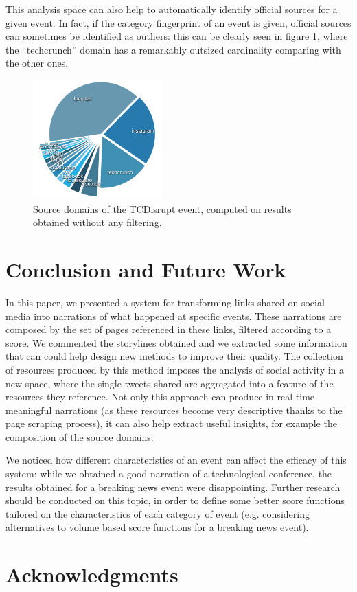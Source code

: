 \documentclass{sig-alternate}
\begin{document}
This analysis space can also help to automatically identify official sources for a given event. In fact, if the category fingerprint of an event is given, official sources can sometimes be identified as outliers: this can be clearly seen in figure \ref{fig:tcdisrupt_outlier}, where the ``techcrunch'' domain has a remarkably outsized cardinality comparing with the other ones.
\begin{figure}[htbp]
  \centering
  \includegraphics[width=5cm]{Figures/tcdisrupt_outlier.png}
  \caption{Source domains of the TCDisrupt event, computed on results obtained without any filtering.}
  \label{fig:tcdisrupt_outlier}
\end{figure}

\section{Conclusion and Future Work}
\label{sec:conclusions}
In this paper, we presented a system for transforming links shared on social media into narrations of what happened at specific events. These narrations are composed by the set of pages referenced in these links, filtered according to a score. We commented the storylines obtained and we extracted some information that can could help design new methods to improve their quality. The collection of resources produced by this method imposes the analysis of social activity in a new space, where the single tweets shared are aggregated into a feature of the resources they reference. Not only this approach can produce in real time meaningful narrations (as these resources become very descriptive thanks to the page scraping process), it can also help extract useful insights, for example the composition of the source domains.

We noticed how different characteristics of an event can affect the efficacy of this system: while we obtained a good narration of a technological conference, the results obtained for a breaking news event were disappointing. Further research should be conducted on this topic, in order to define some better score functions tailored on the characteristics of each category of event (e.g. considering alternatives to volume based score functions for a breaking news event).

\section{Acknowledgments}
\label{sec:ack}

\nocite{*}


\balancecolumns
\end{document}
